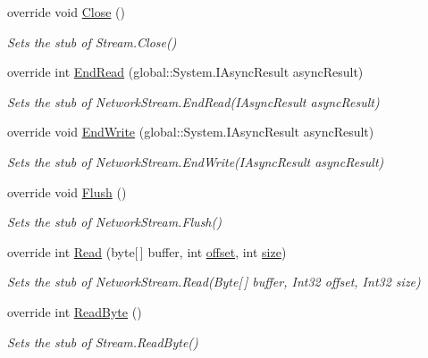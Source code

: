 \begin{DoxyCompactItemize}
override void \hyperlink{class_system_1_1_net_1_1_sockets_1_1_fakes_1_1_stub_network_stream_ad839b806bdaeb551ad8996bbea94f21d}{Close} ()
\begin{DoxyCompactList}\small\item\em Sets the stub of Stream.\-Close()\end{DoxyCompactList}\item 
override int \hyperlink{class_system_1_1_net_1_1_sockets_1_1_fakes_1_1_stub_network_stream_a399d8aeecd8ee99983c9548ec9f855c7}{End\-Read} (global\-::\-System.\-I\-Async\-Result async\-Result)
\begin{DoxyCompactList}\small\item\em Sets the stub of Network\-Stream.\-End\-Read(\-I\-Async\-Result async\-Result)\end{DoxyCompactList}\item 
override void \hyperlink{class_system_1_1_net_1_1_sockets_1_1_fakes_1_1_stub_network_stream_ac9d1fb51221be8e6d6d648c93045d42c}{End\-Write} (global\-::\-System.\-I\-Async\-Result async\-Result)
\begin{DoxyCompactList}\small\item\em Sets the stub of Network\-Stream.\-End\-Write(\-I\-Async\-Result async\-Result)\end{DoxyCompactList}\item 
override void \hyperlink{class_system_1_1_net_1_1_sockets_1_1_fakes_1_1_stub_network_stream_a442835abe1dc2a05dd926b924c521361}{Flush} ()
\begin{DoxyCompactList}\small\item\em Sets the stub of Network\-Stream.\-Flush()\end{DoxyCompactList}\item 
override int \hyperlink{class_system_1_1_net_1_1_sockets_1_1_fakes_1_1_stub_network_stream_a0aededf6a276f39b2f0ec5b294608505}{Read} (byte\mbox{[}$\,$\mbox{]} buffer, int \hyperlink{jquery-1_810_82_8js_a4a9f594d20d927164551fc7fa4751a2f}{offset}, int \hyperlink{jquery-1_810_82_8js_afa6806c6ee5e63d5177f1dcc082ba6bc}{size})
\begin{DoxyCompactList}\small\item\em Sets the stub of Network\-Stream.\-Read(\-Byte\mbox{[}$\,$\mbox{]} buffer, Int32 offset, Int32 size)\end{DoxyCompactList}\item 
override int \hyperlink{class_system_1_1_net_1_1_sockets_1_1_fakes_1_1_stub_network_stream_ad9b9a64277632d9be5b5ca276b2fbc9a}{Read\-Byte} ()
\begin{DoxyCompactList}\small\item\em Sets the stub of Stream.\-Read\-Byte()\end{DoxyCompactList}\item 

\end{DoxyCompactItemize}
